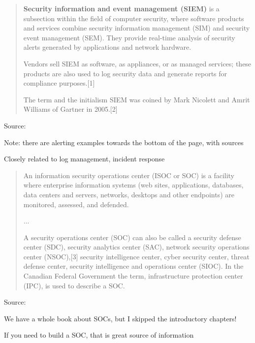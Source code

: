\documentclass[Screen16to9,17pt]{foils}
\begin{document}
\begin{quote}
{\bf Security information and event management (SIEM)} is a subsection within the field of computer security, where software products and services combine security information management (SIM) and security event management (SEM). They provide real-time analysis of security alerts generated by applications and network hardware.

  Vendors sell SIEM as software, as appliances, or as managed services; these products are also used to log security data and generate reports for compliance purposes.[1]

  The term and the initialism SIEM was coined by Mark Nicolett and Amrit Williams of Gartner in 2005.[2]
\end{quote}
Source: 

\begin{list2}
  \item Note: there are alerting examples towards the bottom of the page, with sources
  \item Closely related to log management, incident response
\end{list2}




\begin{quote}
An information security operations center (ISOC or SOC) is a facility where enterprise information systems (web sites, applications, databases, data centers and servers, networks, desktops and other endpoints) are monitored, assessed, and defended.

...

A security operations center (SOC) can also be called a security defense center (SDC), security analytics center (SAC), network security operations center (NSOC),[3] security intelligence center, cyber security center, threat defense center, security intelligence and operations center (SIOC). In the Canadian Federal Government the term, infrastructure protection center (IPC), is used to describe a SOC.
\end{quote}
Source: 

\begin{list2}
  \item We have a whole book about SOCs, but I skipped the introductory chapters!
  \item If you need to build a SOC, that is great source of information
\end{list2}
\end{document}
